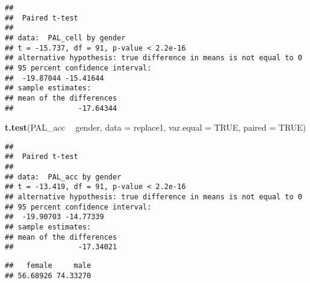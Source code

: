 \documentclass[
]{article}
\newenvironment{Shaded}{\begin{snugshade}}{\end{snugshade}}
\newcommand{\CommentTok}[1]{\textcolor[rgb]{0.56,0.35,0.01}{\textit{#1}}}
\newcommand{\DataTypeTok}[1]{\textcolor[rgb]{0.13,0.29,0.53}{#1}}
\newcommand{\KeywordTok}[1]{\textcolor[rgb]{0.13,0.29,0.53}{\textbf{#1}}}
\newcommand{\NormalTok}[1]{#1}
\newcommand{\OperatorTok}[1]{\textcolor[rgb]{0.81,0.36,0.00}{\textbf{#1}}}
\newcommand{\OtherTok}[1]{\textcolor[rgb]{0.56,0.35,0.01}{#1}}
\newcommand{\StringTok}[1]{\textcolor[rgb]{0.31,0.60,0.02}{#1}}
\begin{document}
\begin{verbatim}
## 
##  Paired t-test
## 
## data:  PAL_cell by gender
## t = -15.737, df = 91, p-value < 2.2e-16
## alternative hypothesis: true difference in means is not equal to 0
## 95 percent confidence interval:
##  -19.87044 -15.41644
## sample estimates:
## mean of the differences 
##               -17.64344
\end{verbatim}

\begin{Shaded}
\begin{Highlighting}[]
\KeywordTok{t.test}\NormalTok{(PAL_acc }\OperatorTok{~}\StringTok{ }\NormalTok{gender, }\DataTypeTok{data =}\NormalTok{ replace1, }\DataTypeTok{var.equal =} \OtherTok{TRUE}\NormalTok{, }\DataTypeTok{paired =} \OtherTok{TRUE}\NormalTok{)}
\end{Highlighting}
\end{Shaded}

\begin{verbatim}
## 
##  Paired t-test
## 
## data:  PAL_acc by gender
## t = -13.419, df = 91, p-value < 2.2e-16
## alternative hypothesis: true difference in means is not equal to 0
## 95 percent confidence interval:
##  -19.90703 -14.77339
## sample estimates:
## mean of the differences 
##               -17.34021
\end{verbatim}

\begin{Shaded}
\end{Shaded}

\begin{verbatim}
##   female     male 
## 56.68926 74.33270
\end{verbatim}
\end{document}

